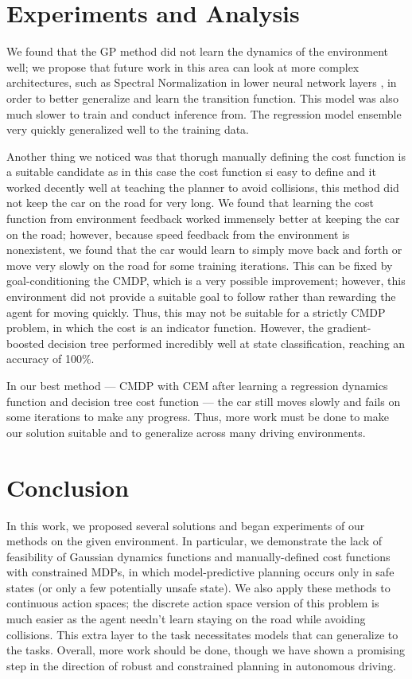 \documentclass{article}
\begin{document}
\section*{Experiments and Analysis}

We found that the GP method did not learn the dynamics of the environment well; we propose that future work in this area can look at more complex architectures, such as Spectral Normalization in lower neural network layers \citep{liu2022simple}, in order to better generalize and learn the transition function. This model was also much slower to train and conduct inference from. The regression model ensemble very quickly generalized well to the training data.

Another thing we noticed was that thorugh manually defining the cost function is a suitable candidate as in this case the cost function si easy to define and it worked decently well at teaching the planner to avoid collisions, this method did not keep the car on the road for very long. We found that learning the cost function from environment feedback worked immensely better at keeping the car on the road; however, because speed feedback from the environment is nonexistent, we found that the car would learn to simply move back and forth or move very slowly on the road for some training iterations. This can be fixed by goal-conditioning the CMDP, which is a very possible improvement; however, this environment did not provide a suitable goal to follow rather than rewarding the agent for moving quickly. Thus, this may not be suitable for a strictly CMDP problem, in which the cost is an indicator function. However, the gradient-boosted decision tree performed incredibly well at state classification, reaching an accuracy of 100\%. 

In our best method — CMDP with CEM after learning a regression dynamics function and decision tree cost function — the car still moves slowly and fails on some iterations to make any progress. Thus, more work must be done to make our solution suitable and to generalize across many driving environments.

\section*{Conclusion}

In this work, we proposed several solutions and began experiments of our methods on the given environment. In particular, we demonstrate the lack of feasibility of Gaussian dynamics functions and manually-defined cost functions with constrained MDPs, in which model-predictive planning occurs only in safe states (or only a few potentially unsafe state). We also apply these methods to continuous action spaces; the discrete action space version of this problem is much easier as the agent needn't learn staying on the road while avoiding collisions. This extra layer to the task necessitates models that can generalize to the tasks. Overall, more work should be done, though we have shown a promising step in the direction of robust and constrained planning in autonomous driving.

\end{document}

